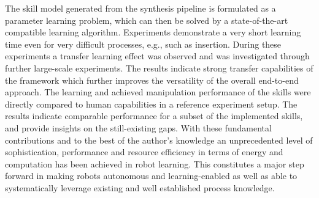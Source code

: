 The skill model generated from the synthesis pipeline is formulated as a parameter learning problem, which can then be solved by a state-of-the-art compatible learning algorithm.
Experiments demonstrate a very short learning time even for very difficult processes, e.g., such as insertion. 
During these experiments a transfer learning effect was observed and was investigated through further large-scale experiments. The results indicate strong transfer capabilities of the \skillmodelabbr{} framework which further improves the versatility of the overall end-to-end approach.
The learning and achieved manipulation performance of the skills were directly compared to human capabilities in a reference experiment setup. The results indicate comparable performance for a subset of the implemented skills, and provide insights on the still-existing gaps.
\newline
\newline
With these fundamental contributions and to the best of the author's knowledge an unprecedented level of sophistication, performance and resource efficiency in terms of energy and computation has been achieved in robot learning. This constitutes a major step forward in making robots autonomous and learning-enabled as well as able to systematically leverage existing and well established process knowledge. 
